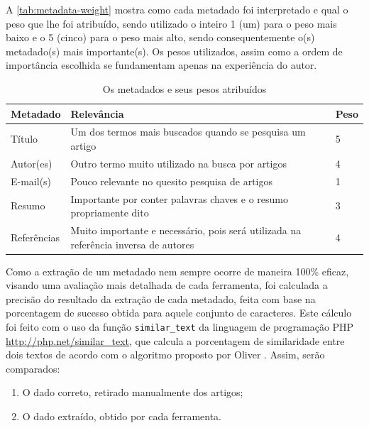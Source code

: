 A \autoref{tab:metadata-weight} mostra como cada metadado foi interpretado e qual o peso que lhe foi atribuído, sendo utilizado o inteiro 1 (um) para o peso mais baixo e o 5 (cinco) para o peso mais alto, sendo consequentemente o(s) metadado(s) mais importante(s). Os pesos utilizados, assim como a ordem de importância escolhida se fundamentam apenas na experiência do autor.


\begin{table}
    \caption{Os metadados e seus pesos atribuídos}
    \begin{center}
        \begin{tabular}{|p{3cm}|p{8cm}|C{1cm}|}
            \hline \textbf{Metadado} & \textbf{Relevância} & \textbf{Peso} \\ 
            \hline Título & Um dos termos mais buscados quando se pesquisa um artigo & 5 \\
            \hline Autor(es) & Outro termo muito utilizado na busca por artigos & 4 \\
            \hline E-mail(s) & Pouco relevante no quesito pesquisa de artigos & 1 \\
            \hline Resumo & Importante por conter palavras chaves e o resumo propriamente dito & 3 \\
            \hline Referências & Muito importante e necessário, pois será utilizada na referência inversa de autores & 4 \\
            \hline 
        \end{tabular} 
    \end{center}
    \label{tab:metadata-weight}
\end{table}

Como a extração de um metadado nem sempre ocorre de maneira 100\% eficaz, visando uma avaliação mais detalhada de cada ferramenta, foi calculada a precisão do resultado da extração de cada metadado, feita com base na porcentagem de sucesso obtida para aquele conjunto de caracteres. Este cálculo foi feito com o uso da função \texttt{similar\_text} da linguagem de programação PHP \url{http://php.net/similar_text}, que calcula a porcentagem de similaridade entre dois textos de acordo com o algoritmo proposto por Oliver \cite{oliver-1993}. Assim, serão comparados:

\begin{enumerate}
    \item O dado correto, retirado manualmente dos artigos;
    \item O dado extraído, obtido por cada ferramenta.
\end{enumerate}

